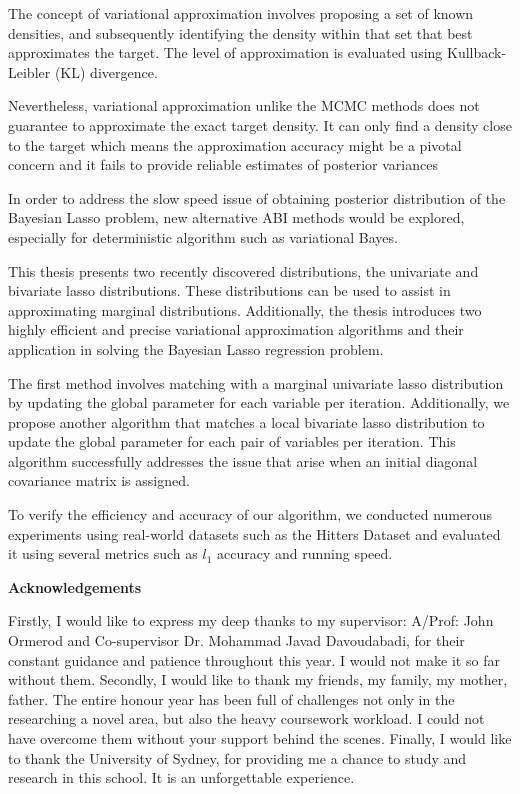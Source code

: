 The concept of variational approximation involves proposing a set of known densities, and subsequently identifying the density within that set that best approximates the target. The level of approximation is evaluated using Kullback-Leibler (KL) divergence.

Nevertheless, variational approximation unlike the MCMC methods does not guarantee to approximate the exact target density. It can only find a density close to the target which means the approximation accuracy might  be a pivotal concern and it fails to provide reliable estimates of posterior variances

In order to address the slow speed issue of obtaining posterior distribution of the Bayesian Lasso problem, new alternative ABI methods would be explored, especially for deterministic algorithm such as variational Bayes.

This thesis presents two recently discovered distributions, the univariate and bivariate lasso distributions. These distributions can be used to assist in approximating marginal distributions. Additionally, the thesis introduces two highly efficient and precise variational approximation algorithms and their application in solving the Bayesian Lasso regression problem.


The first method involves matching with a marginal univariate lasso distribution by updating the global parameter for each variable per iteration. Additionally, we propose another algorithm that matches a local bivariate lasso distribution to update the global parameter for each pair of variables per iteration. This algorithm successfully addresses the issue that arise when an initial diagonal covariance matrix is assigned.

To verify the efficiency and accuracy of our algorithm, we conducted numerous experiments using real-world datasets such as the Hitters Dataset and evaluated it using several metrics such as $l_1$ accuracy and running speed.


\newpage

\begin{center}
    \textbf{\large Acknowledgements}\\
    \vspace{0.5cm}
\end{center}
	Firstly, I would like to express my deep thanks to my supervisor: A/Prof: John Ormerod and Co-supervisor Dr. Mohammad Javad Davoudabadi, for their constant guidance and patience throughout this year. I would not make it so far without them.
   	Secondly, I would like to thank my friends, my family, my mother, father. The entire honour year has been full of challenges not only in the researching a novel area, but also the heavy coursework workload. I could not have overcome them without your support behind the scenes.
    Finally, I would like to thank the University of Sydney, for providing me a chance to study and research in this school. It is an unforgettable experience.
\vfill
\hspace{0pt}
\pagebreak
\newpage